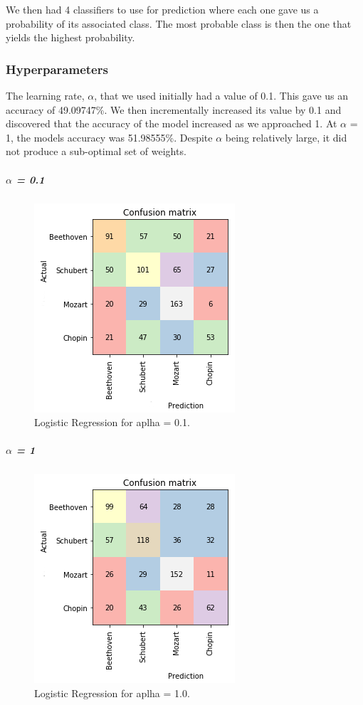 \documentclass[11pt]{article}
\makeatletter
\def\maxwidth{\ifdim\Gin@nat@width>\linewidth\linewidth
    \else\Gin@nat@width\fi}
\let\Oldincludegraphics\includegraphics
\renewcommand{\includegraphics}[1]{\Oldincludegraphics[width=.8\maxwidth]{#1}}
\makeatother
\begin{document}
We then had 4 classifiers to use for prediction where each one gave us a
probability of its associated class. The most probable class is then the
one that yields the highest probability.

\subsubsection{Hyperparameters}\label{hyperparameters}

The learning rate, \(\alpha\), that we used initially had a value of
0.1. This gave us an accuracy of 49.09747\%. We then incrementally
increased its value by 0.1 and discovered that the accuracy of the model
increased as we approached 1. At \(\alpha\) = 1, the models accuracy was
51.98555\%. Despite \(\alpha\) being relatively large, it did not
produce a sub-optimal set of weights.

\subparagraph{\texorpdfstring{\(\alpha\) =
0.1}{\textbackslash{}alpha = 0.1}}\label{alpha-0.1}

\begin{figure}[h!]
\centering
\includegraphics{report/plots/LRalpha1.png}
\caption{Logistic Regression for aplha = 0.1.}
\end{figure}

\subparagraph{\texorpdfstring{\(\alpha\) =
1}{\textbackslash{}alpha = 1}}\label{alpha-1}

\begin{figure}[h!]
\centering
\includegraphics{report/plots/LRalpha2.png}
\caption{Logistic Regression for aplha = 1.0.}
\end{figure}
\end{document}
